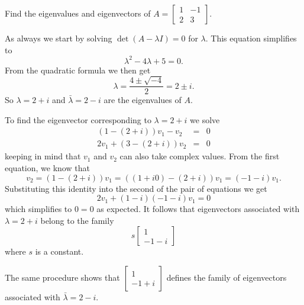 \documentclass[../book.tex]{subfiles}
\begin{document}
\begin{example} \label{eg:complex}
Find the eigenvalues and eigenvectors of \(A= \begin{bmatrix}1 & -1 \\ 2 & 3\end{bmatrix}\).
\end{example}
\begin{solution}
As always we start by solving \(\det (A - \lambda I)=0\) for \(\lambda\). This equation simplifies to
\begin{equation}\label{eq:eig-19}
\lambda^2 - 4  \lambda + 5 = 0.
\end{equation}
From the quadratic formula we then get
\begin{equation}\label{eq:eig-20}
\lambda = \frac{4 \pm \sqrt{-4}}{2} = 2 \pm i.
\end{equation}
So \(\lambda = 2 + i\) and \(\bar \lambda = 2 -i\) are the eigenvalues of \(A\).

To find the eigenvector corresponding to \(\lambda = 2+i\) we solve
\begin{equation}\label{eq:eig-21}
\begin{array}{lcl}
  ( 1-(2+i) )  v_1 - v_2  &=& 0 \\
  2 v_1 + (3 - (2+i)) v_2 &=& 0
\end{array}
\end{equation}
keeping in mind that \(v_1\) and \(v_2\) can also take complex values. From the first equation, we know that
\begin{equation}\label{eq:eig-22}
v_2 
= (1-(2+i))  v_1 
= ( (1+i 0) - (2 + i) ) v_1
=(-1-i) v_1.
\end{equation}
Substituting this identity into the second of the pair of equations we get
\begin{equation}\label{eq:eig-23}
2 v_1 + (1-i)(-1-i)  v_1 = 0
\end{equation}
which simplifies to \(0=0\) as expected. It follows that eigenvectors associated with \(\lambda=2+i\) belong to the family
\begin{equation}\label{eq:eig-24}
s 
\begin{bmatrix}
  1 \\
  -1-i
\end{bmatrix}
\end{equation}
where \(s\) is a constant.

The same procedure shows that \(\begin{bmatrix}1 \\ -1 + i\end{bmatrix}\) defines the family of eigenvectors associated with \(\bar \lambda = 2-i\).
\end{solution}
\end{document}

